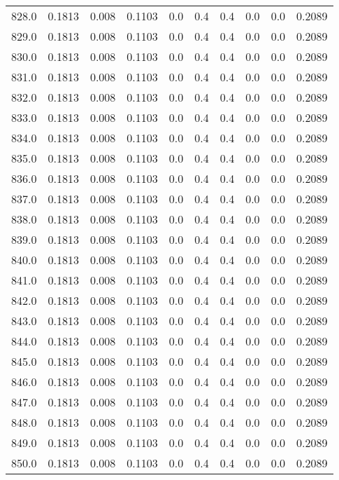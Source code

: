 \begin{longtable}{lrrrrrrrrr}
828.0 & 0.1813 & 0.008 & 0.1103 & 0.0 & 0.4 & 0.4 & 0.0 & 0.0 & 0.2089 \\
829.0 & 0.1813 & 0.008 & 0.1103 & 0.0 & 0.4 & 0.4 & 0.0 & 0.0 & 0.2089 \\
830.0 & 0.1813 & 0.008 & 0.1103 & 0.0 & 0.4 & 0.4 & 0.0 & 0.0 & 0.2089 \\
831.0 & 0.1813 & 0.008 & 0.1103 & 0.0 & 0.4 & 0.4 & 0.0 & 0.0 & 0.2089 \\
832.0 & 0.1813 & 0.008 & 0.1103 & 0.0 & 0.4 & 0.4 & 0.0 & 0.0 & 0.2089 \\
833.0 & 0.1813 & 0.008 & 0.1103 & 0.0 & 0.4 & 0.4 & 0.0 & 0.0 & 0.2089 \\
834.0 & 0.1813 & 0.008 & 0.1103 & 0.0 & 0.4 & 0.4 & 0.0 & 0.0 & 0.2089 \\
835.0 & 0.1813 & 0.008 & 0.1103 & 0.0 & 0.4 & 0.4 & 0.0 & 0.0 & 0.2089 \\
836.0 & 0.1813 & 0.008 & 0.1103 & 0.0 & 0.4 & 0.4 & 0.0 & 0.0 & 0.2089 \\
837.0 & 0.1813 & 0.008 & 0.1103 & 0.0 & 0.4 & 0.4 & 0.0 & 0.0 & 0.2089 \\
838.0 & 0.1813 & 0.008 & 0.1103 & 0.0 & 0.4 & 0.4 & 0.0 & 0.0 & 0.2089 \\
839.0 & 0.1813 & 0.008 & 0.1103 & 0.0 & 0.4 & 0.4 & 0.0 & 0.0 & 0.2089 \\
840.0 & 0.1813 & 0.008 & 0.1103 & 0.0 & 0.4 & 0.4 & 0.0 & 0.0 & 0.2089 \\
841.0 & 0.1813 & 0.008 & 0.1103 & 0.0 & 0.4 & 0.4 & 0.0 & 0.0 & 0.2089 \\
842.0 & 0.1813 & 0.008 & 0.1103 & 0.0 & 0.4 & 0.4 & 0.0 & 0.0 & 0.2089 \\
843.0 & 0.1813 & 0.008 & 0.1103 & 0.0 & 0.4 & 0.4 & 0.0 & 0.0 & 0.2089 \\
844.0 & 0.1813 & 0.008 & 0.1103 & 0.0 & 0.4 & 0.4 & 0.0 & 0.0 & 0.2089 \\
845.0 & 0.1813 & 0.008 & 0.1103 & 0.0 & 0.4 & 0.4 & 0.0 & 0.0 & 0.2089 \\
846.0 & 0.1813 & 0.008 & 0.1103 & 0.0 & 0.4 & 0.4 & 0.0 & 0.0 & 0.2089 \\
847.0 & 0.1813 & 0.008 & 0.1103 & 0.0 & 0.4 & 0.4 & 0.0 & 0.0 & 0.2089 \\
848.0 & 0.1813 & 0.008 & 0.1103 & 0.0 & 0.4 & 0.4 & 0.0 & 0.0 & 0.2089 \\
849.0 & 0.1813 & 0.008 & 0.1103 & 0.0 & 0.4 & 0.4 & 0.0 & 0.0 & 0.2089 \\
850.0 & 0.1813 & 0.008 & 0.1103 & 0.0 & 0.4 & 0.4 & 0.0 & 0.0 & 0.2089 \\

\end{longtable}
